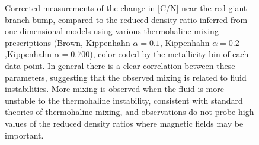 \begin{figure}[!htb]
\begin{minipage}{1.0\textwidth}
\begin{center}

\def\stackalignment{l}


\caption{Corrected measurements of the change in [C/N] near the red giant branch bump, compared to the reduced density ratio inferred from one-dimensional models using various thermohaline mixing prescriptions (Brown, Kippenhahn $\alpha=0.1$, Kippenhahn $\alpha=0.2$,Kippenhahn $\alpha=0.700$), color coded by the metallicity bin of each data point. In general there is a clear correlation between these parameters, suggesting that the observed mixing is related to fluid instabilities. More mixing is observed when the fluid is more unstable to the thermohaline instability, consistent with standard theories of thermohaline mixing, and observations do not probe high values of the reduced density ratios where magnetic fields may be important. }
\label{Fig:punchline}
\end{center}
\end{minipage}
\end{figure}
